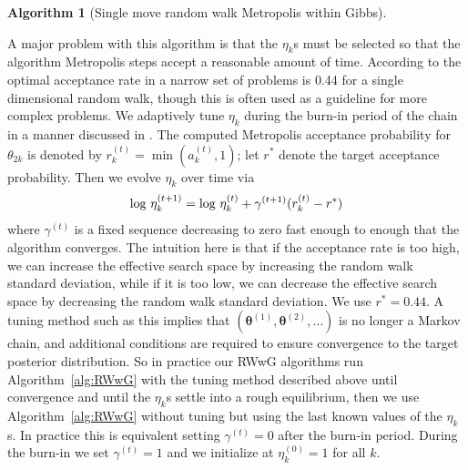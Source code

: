 \documentclass[12pt]{article}
\def\log{\hbox{log}}
\newtheorem{alg}{Algorithm}
\begin{document}
\begin{appendix}
\begin{alg}[Single move random walk Metropolis within Gibbs]
\begin{enumerate}
\begin{itemize}
\end{itemize}
\end{enumerate}
\end{alg}
A major problem with this algorithm is that the $\eta_k$s must be selected so that the algorithm Metropolis steps accept a reasonable amount of time. According to \citet{gelman1996efficient} the optimal acceptance rate in a narrow set of problems is 0.44 for a single dimensional random walk, though this is often used as a guideline for more complex problems. We adaptively tune $\eta_k$ during the burn-in period of the chain in a manner discussed in \citet{andrieu2008tutorial}. The computed Metropolis acceptance probability for $\theta_{2k}$ is denoted by $r_{k}^{(t)} = \min(a_k^{(t)}, 1)$; let $r^*$ denote the target acceptance probability. Then we evolve $\eta_k$ over time via
\begin{align*}
\log\ \eta_{k}^{(t+1)} = \log\ \eta_{k}^{(t)} + \gamma^{(t+1)}(r_k^{(t)} - r^*)
\end{align*}
where $\gamma^{(t)}$ is a fixed sequence decreasing to zero fast enough to enough that the algorithm converges. The intuition here is that if the acceptance rate is too high, we can increase the effective search space by increasing the random walk standard deviation, while if it is too low, we can decrease the effective search space by decreasing the random walk standard deviation. We use $r^*=0.44$. A tuning method such as this implies that $(\bm{\theta}^{(1)}, \bm{\theta}^{(2)},\dots)$ is no longer a Markov chain, and additional conditions are required to ensure convergence to the target posterior distribution. So in practice our RWwG algorithms run Algorithm~\ref{alg:RWwG} with the tuning method described above until convergence and until the $\eta_k$s settle into a rough equilibrium, then we use Algorithm~\ref{alg:RWwG} without tuning but using the last known values of the $\eta_k$s. In practice this is equivalent setting $\gamma^{(t)}=0$ after the burn-in period. During the burn-in we set $\gamma^{(t)}=1$ and we initialize at $\eta_k^{(0)}=1$ for all $k$.


\end{appendix}
\end{document}
